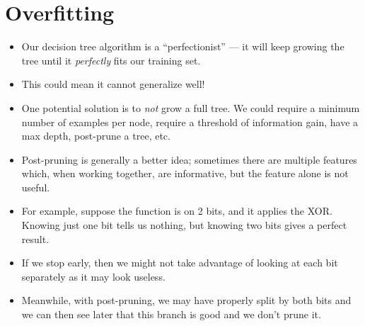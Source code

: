 \documentclass{article}
\begin{document}
\section{Overfitting}
\begin{itemize}
    \item Our decision tree algorithm is a ``perfectionist'' --- it will keep growing the tree until it \emph{perfectly} fits our training set.
    \item This could mean it cannot generalize well!
    \item One potential solution is to \emph{not} grow a full tree.  We could require a minimum number of examples per node, require a threshold of information gain, have a max depth, post-prune a tree, etc.
    \item Post-pruning is generally a better idea; sometimes there are multiple features which, when working together, are informative, but the feature alone is not useful.
    \item For example, suppose the function is on 2 bits, and it applies the XOR.  Knowing just one bit tells us nothing, but knowing two bits gives a perfect result.
    \item If we stop early, then we might not take advantage of looking at each bit separately as it may look useless.
    \item Meanwhile, with post-pruning, we may have properly split by both bits and we can then see later that this branch is good and we don't prune it.
\end{itemize}
\end{document}
